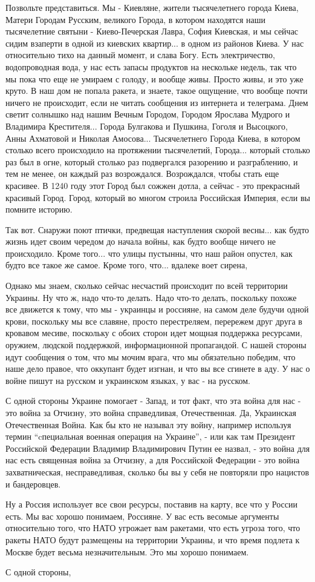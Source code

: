 Позвольте представиться. Мы - Киевляне, жители тысячелетнего города Киева,
Матери Городам Русским, великого Города, в котором находятся наши тысячелетние
святыни - Киево-Печерская Лавра, София Киевская, и мы сейчас сидим взаперти в
одной из киевских квартир... в одном из районов Киева. У нас относительно тихо
на данный момент, и слава Богу. Есть электричество, водопроводная вода, у нас
есть запасы продуктов на нескольке недель, так что мы пока что еще не умираем с
голоду, и вообще живы. Просто живы, и это уже круто. В наш дом не попала
ракета, и знаете, такое ощущение, что вообще почти ничего не происходит, если
не читать сообщения из интернета и телеграма. Днем светит солнышко над нашим
Вечным Городом, Городом Ярослава Мудрого и Владимира Крестителя... Города
Булгакова и Пушкина, Гоголя и Высоцкого, Анны Ахматовой и Николая Амосова...
Тысячелетнего Города Киева, в котором столько всего происходило на протяжении
тысячелетий, Города... который столько раз был в огне, который столько раз
подвергался разорению и разграблению, и тем не менее, он каждый раз
возрождался. Возрождался, чтобы стать еще красивее. В 1240 году этот Город был
сожжен дотла, а сейчас - это прекрасный красивый Город. Город, который во
многом строила Российская Империя, если вы помните историю.

Так вот. Снаружи поют птички, предвещая наступления скорой весны... как будто жизнь идет
своим чередом до начала войны, как будто вообще ничего не происходило. Кроме
того...  что улицы пустынны, что наш район опустел, как будто все такое же
самое. Кроме того, что... вдалеке воет сирена, 

Однако мы знаем, сколько сейчас несчастий происходит по всей территории
Украины. Ну что ж, надо что-то делать. Надо что-то делать, поскольку похоже все
движется к тому, что мы - украинцы и россияне, на самом деле будучи одной
крови, поскольку мы все славяне, просто перестреляем, перережем друг друга в
кровавом месиве, поскольку с обоих сторон идет мощная поддержка ресурсами,
оружием, людской поддержкой, информационной пропагандой. С нашей стороны идут
сообщения о том, что мы мочим врага, что мы обязательно победим, что наше дело
правое, что оккупант будет изгнан, и что вы все сгинете в аду. У нас о войне
пишут на русском и украинском языках, у вас - на русском. 

С одной стороны Украине помогает - Запад, и тот факт, что эта война для нас -
это война за Отчизну, это война справедливая, Отечественная. Да, Украинская
Отечественная Война. Как бы кто не называл эту войну, например используя термин
\enquote{cпециальная военная операция на Украине}, - или как там Президент
Российской Федерации Владимир Владимирович Путин ее назвал, - это война для нас
есть священная война за Отчизну, а для Российской Федерации - это война
захватническая, несправедливая, сколько бы вы у себя не повторяли про нацистов
и бандеровцев. 

Ну а Россия использует все свои ресурсы, поставив на карту, все что у России
есть.  Мы вас хорошо понимаем, Россияне. У вас есть весомые аргументы
относительно того, что НАТО угрожает вам ракетами, что есть угроза того, что
ракеты НАТО будут размещены на территории Украины, и что время подлета к Москве
будет весьма незначительным. Это мы хорошо понимаем. 

С одной стороны,
